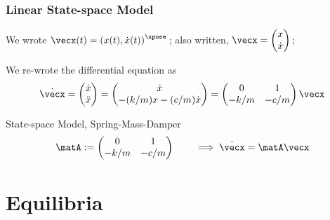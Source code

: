 \documentclass[12pt]{beamer}
\begin{document}
\begin{frame}
\frametitle{Linear State-space Model}

\begin{itemize}
\vitem
We wrote 
$\vecx(t) = \left( x(t), \dot x(t) \right)^\xpose$;
also written, 
$\vecx = \begin{pmatrix} x \\ \dot x \end{pmatrix}$;

\vitem
We re-wrote the differential equation as
{\small
\[
\dot \vecx
	= \begin{pmatrix} \dot x \\ \ddot x \end{pmatrix}
	= \begin{pmatrix}
		\dot x \\
		-(k/m) x - (c/m) \dot x
		\end{pmatrix}
	= \begin{pmatrix} 0 & 1 \\ -k/m & -c/m \end{pmatrix}
	\vecx
\]
}
\end{itemize}

%

\begin{block}{State-space Model, Spring-Mass-Damper}
\[
\matA := \begin{pmatrix} 0 & 1 \\ -k/m & -c/m \end{pmatrix}
\qquad \implies
\dot{\vecx} = \matA \vecx
\]
\end{block}

\end{frame}







\section{Equilibria}
\end{document}
